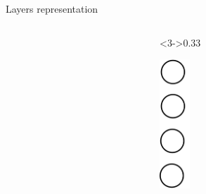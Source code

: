 \documentclass[xcolor=pdftex,dvipsnames,table,mathserif]{beamer}
\begin{document}
\begin{frame}{Layers representation}
\begin{columns}
\begin{column}
\begin{center}
      \end{center}
    \end{column}

    \begin{column}<3->{0.33\textwidth}
      \begin{center}
        \includegraphics[width=0.15\textwidth]{image_as_neurons_col.png}

      \end{center}
    \end{column}

  \end{columns}


\end{frame}
\end{document}
